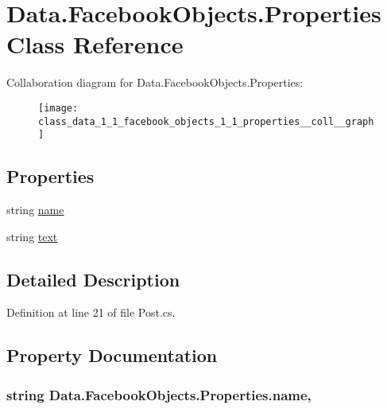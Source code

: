 \hypertarget{class_data_1_1_facebook_objects_1_1_properties}{}\section{Data.\+Facebook\+Objects.\+Properties Class Reference}
\label{class_data_1_1_facebook_objects_1_1_properties}


Collaboration diagram for Data.\+Facebook\+Objects.\+Properties\+:
\nopagebreak
\begin{figure}[H]
\begin{center}
\leavevmode
\texttt{[image: class\_data\_1\_1\_facebook\_objects\_1\_1\_properties\_\_coll\_\_graph]}
\end{center}
\end{figure}
\subsection*{Properties}
\begin{DoxyCompactItemize}
\item 
string \hyperlink{class_data_1_1_facebook_objects_1_1_properties_a530a5e9d4bc85426eefe154d5ef069f9}{name}
\item 
string \hyperlink{class_data_1_1_facebook_objects_1_1_properties_aed35ce8968a53f6250ad88398e4218b1}{text}
\end{DoxyCompactItemize}


\subsection{Detailed Description}


Definition at line 21 of file Post.\+cs.



\subsection{Property Documentation}
\subsubsection[{\texorpdfstring{name}{name}}]{\setlength{\rightskip}{0pt plus 5cm}string Data.\+Facebook\+Objects.\+Properties.\+name\hspace{0.3cm}{\ttfamily [get]}, {\ttfamily [set]}}\hypertarget{class_data_1_1_facebook_objects_1_1_properties_a530a5e9d4bc85426eefe154d5ef069f9}{}\label{class_data_1_1_facebook_objects_1_1_properties_a530a5e9d4bc85426eefe154d5ef069f9}


